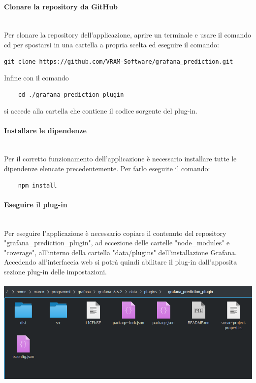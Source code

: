 \paragraph{Clonare la repository da GitHub}\mbox{}\\ [1mm]
Per clonare la repository dell'applicazione, aprire un terminale e usare il comando cd per spostarsi in una cartella a propria scelta ed eseguire il comando:
\begin{verbatim}git clone https://github.com/VRAM-Software/grafana_prediction.git
\end{verbatim}
Infine con il comando 
\begin{verbatim}
	cd ./grafana_prediction_plugin
\end{verbatim}
si accede alla cartella che contiene il codice sorgente del plug-in.

\paragraph{Installare le dipendenze}\mbox{}\\ [1mm]
Per il corretto funzionamento dell'applicazione è necessario installare tutte le dipendenze elencate precedentemente. Per farlo eseguite il comando:
\begin{verbatim}
	npm install
\end{verbatim}

\paragraph{Eseguire il plug-in}\mbox{}\\ [1mm]
Per eseguire l'applicazione è necessario copiare il contenuto del repository "grafana\_prediction\_plugin", ad eccezione delle cartelle "node\_modules" e "coverage", all'interno della cartella "data/plugins" dell'installazione Grafana\glo. Accedendo all'interfaccia web si potrà quindi abilitare il plug-in dall'apposita sezione plug-in delle impostazioni.
\\
\\
\includegraphics[width=\textwidth,height=\textheight,keepaspectratio]{img/plugin-directory.png}

